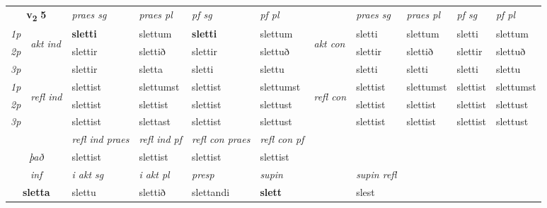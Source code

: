 \noindent
\begin{tabular}{lllllllllll} \toprule
\multicolumn{2}{c}{\textbf{v{\textsubscript{2}}} \Large{\textbf{5}}}  &  \textit{praes sg}  & \textit{praes pl}  &\textit{ pf sg} & \textit{pf pl} &  &  \textit{praes sg}  & \textit{praes pl}  & \textit{pf sg} & \textit{pf pl } \\*
	\cmidrule{3-6} \cmidrule{8-11}
 {\textit{1p}} & \multirow{3}{*}{\begin{turn}{90}\textit{akt ind}\end{turn}} & \textbf{sletti} & slettum & \textbf{sletti} & slettum & \multirow{3}{*}{\begin{turn}{90}\textit{akt con}\end{turn}} &sletti & slettum & sletti & slettum\\*
 {\textit{2p}} &  &  slettir  & slettið & slettir & slettuð & & slettir & slettið & slettir & slettuð \\*
{\textit{3p}} &  & slettir & sletta & sletti & slettu & & sletti & sletti& sletti & slettu \\*
\cmidrule{3-6} \cmidrule{8-11}
 {\textit{1p}} & \multirow{3}{*}{\begin{turn}{90}\textit{refl ind}\end{turn}}  & slettist & slettumst & slettist & slettumst & \multirow{3}{*}{\begin{turn}{90}\textit{refl con}\end{turn}}  &slettist & slettumst & slettist & slettumst \\*
 {\textit{2p}} &  & slettist & slettist & slettist & slettust & &slettist & slettist & slettist & slettust \\*
 {\textit{3p}}  & & slettist & slettast & slettist & slettust & & slettist & slettist& slettist & slettust \\*
\cmidrule{3-6} \cmidrule{8-11}

 & & \textit{refl ind praes} & \textit{refl ind pf} & \textit{refl con praes} & \textit{refl con pf} \\*
 \multicolumn{2}{c}{ \textit{það} }& slettist & slettist & slettist & slettist \\*

\cmidrule{3-8}
   \multicolumn{2}{c}{\textit{inf}}  & \textit{i akt sg} & \textit{i akt pl}   & \textit{presp} & \textit{supin} && \textit{supin refl}  \\*
  \multicolumn{2}{c}{\textbf{sletta}} & slettu  & slettið   & slettandi &  \textbf{slett} && slest  \\*
\end{tabular}

